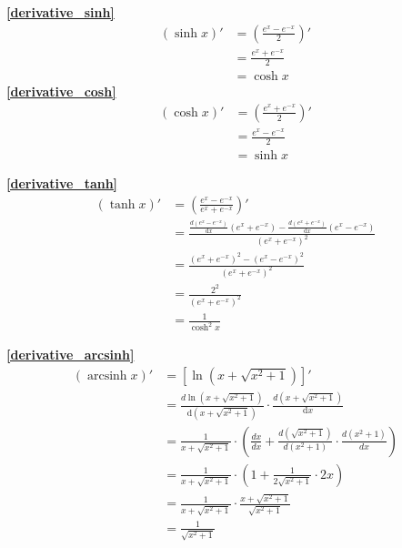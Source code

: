 \textbf{\large \ref{derivative_sinh}}
\begin{align*}
        (\sinh x)'&=\left(\frac{e^x-e^{-x}}{2}\right)'\\
                                    &=\frac{e^x+e^{-x}}{2}\\
                                    &=\cosh x
\end{align*}
\textbf{\large \ref{derivative_cosh}}
\begin{align*}
        (\cosh x)'&=\left(\frac{e^x+e^{-x}}{2}\right)'\\
                                    &=\frac{e^x-e^{-x}}{2}\\
                                    &=\sinh x
\end{align*}

\textbf{\large \ref{derivative_tanh}}
\begin{align*}
        (\tanh x)'&=\left(\frac{e^x-e^{-x}}{e^x+e^{-x}}\right)'\\
                                    &=\frac{\frac{d(e^x-e^{-x})}{\mathrm{d}{x}}(e^x+e^{-x})-\frac{d(e^x+e^{-x})}{\mathrm{d}{x}}(e^x-e^{-x})}{\left(e^x+e^{-x}\right)^2}\\
                                    &=\frac{\left(e^x+e^{-x}\right)^2-\left(e^x-e^{-x}\right)^2}{\left(e^x+e^{-x}\right)^2}\\
                                    &=\frac{2^2}{\left(e^x+e^{-x}\right)^2}\\
                                    &=\frac{1}{\cosh^2 x}
\end{align*}

\textbf{\large \ref{derivative_arcsinh}}
\begin{align*}
        (\operatorname{arcsinh}{x})' &=\left[\ln(x+\sqrt{x^2+1})\right]'\\
                                    &=\frac{d \ln(x+\sqrt{x^2+1})}{\mathrm{d}{\left(x+\sqrt{x^2+1}\right)}}\cdot\frac{d \left(x+\sqrt{x^2+1}\right)}{\mathrm{d}{x}}\\
                                    &=\frac{1}{x+\sqrt{x^2+1}}\cdot\left(\frac{dx}{dx}+\frac{d \left(\sqrt{x^2+1}\right)}{d\left(x^2+1\right)}\cdot\frac{d(x^2+1)}{dx}\right)\\
                                    &=\frac{1}{x+\sqrt{x^2+1}}\cdot\left(1+\frac{1}{2\sqrt{x^2+1}}\cdot 2x\right)\\                                    
                                    &=\frac{1}{x+\sqrt{x^2+1}}\cdot\frac{x+\sqrt{x^2+1}}{\sqrt{x^2+1}}\\
                                    &=\frac{1}{\sqrt{x^2+1}}
\end{align*}

